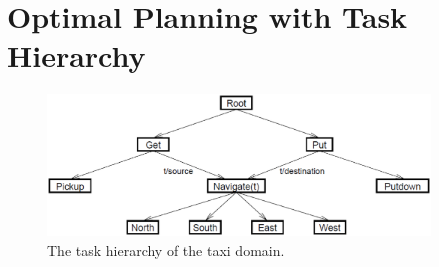 
\section{Optimal Planning with Task Hierarchy}
\begin{figure}[t]
\begin{center}
    \includegraphics[width=4in] {./figures/TaxiHierarchy.eps}
\end{center}
\caption{The task hierarchy of the taxi domain.}
\label{fig:taxi}
\end{figure}

